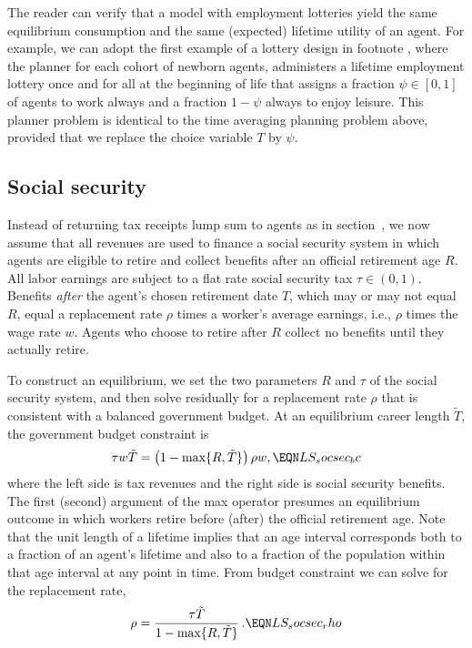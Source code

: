 The reader can verify that a model with employment lotteries yield
the same equilibrium consumption and the same (expected) lifetime utility of
an agent. For example, we can adopt the first example of a lottery design
in footnote , where the planner for each cohort
of newborn agents, administers
a lifetime employment lottery once and for all at the beginning of
life that assigns a fraction $\psi\in [0,1]$ of agents to work
always and a fraction $1-\psi$ always to enjoy leisure. This planner
problem is identical to the time averaging planning problem above, provided that we replace  the choice variable $T$ by $\psi$.



\subsection{Social security}\label{sec:LSsocialsecurity}%
Instead of returning  tax receipts lump sum to agents as in
section~, we now assume that all revenues are
used to finance a social security system in which
agents are eligible to retire and collect benefits after an official
retirement age $R$. All labor earnings are subject to a
flat rate social security tax $\tau\in(0,1)$. Benefits {\it after}
the agent's chosen retirement date $T$, which
may or may not equal $R$, equal  a replacement rate $\rho$
times a worker's average earnings, i.e., $\rho$ times the wage rate $w$.
Agents who choose to retire after $R$  collect no  benefits
until they actually retire.

To construct an equilibrium, we set the two parameters $R$
and $\tau$ of the social security system, and then solve residually for
a replacement rate $\rho$ that is consistent with a balanced government
budget. At an equilibrium career length $\tilde T$, the government
budget constraint is
$$
\tau w \tilde T  = \left(1- \max\{R, \tilde T\} \right) \rho w,  \EQN LS_socsec_bc
$$
where the left side is tax revenues and the right side is social
security benefits. The first (second) argument of the max operator
presumes an equilibrium outcome in which workers retire before (after)
the official retirement age.
Note that the unit length of a lifetime implies that  an age interval
corresponds  both to a fraction of an agent's lifetime and also to a
fraction of the population within that age interval at any point in time.
From budget constraint  we can solve for the
replacement rate,
$$
\rho = {\tau \tilde T \over 1- \max\{R, \tilde T\}}\,.  \EQN LS_socsec_rho
$$

